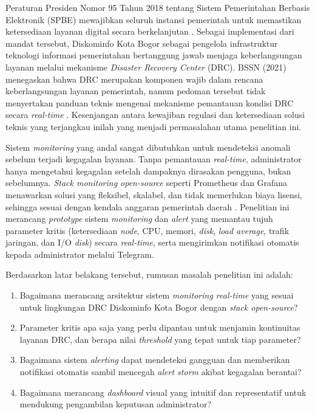 \documentclass[10pt,twocolumn]{article}
\begin{document}
Peraturan Presiden Nomor 95 Tahun 2018 tentang Sistem Pemerintahan Berbasis Elektronik (SPBE)
mewajibkan seluruh instansi pemerintah untuk memastikan ketersediaan layanan digital secara
berkelanjutan \cite{perpres2018}. Sebagai implementasi dari mandat tersebut, Diskominfo Kota Bogor
sebagai pengelola infrastruktur teknologi informasi pemerintahan bertanggung jawab menjaga
keberlangsungan layanan melalui mekanisme \textit{Disaster Recovery Center} (DRC). BSSN (2021)
menegaskan bahwa DRC merupakan komponen wajib dalam rencana keberlangsungan layanan pemerintah,
namun pedoman tersebut tidak menyertakan panduan teknis mengenai mekanisme pemantauan kondisi DRC
secara \textit{real-time} \cite{bssn2021}. Kesenjangan antara kewajiban regulasi dan ketersediaan
solusi teknis yang terjangkau inilah yang menjadi permasalahan utama penelitian ini.

Sistem \textit{monitoring} yang andal sangat dibutuhkan untuk mendeteksi anomali sebelum terjadi
kegagalan layanan. Tanpa pemantauan \textit{real-time}, administrator hanya mengetahui kegagalan
setelah dampaknya dirasakan pengguna, bukan sebelumnya. \textit{Stack monitoring open-source} seperti
Prometheus dan Grafana menawarkan solusi yang fleksibel, skalabel, dan tidak memerlukan biaya lisensi,
sehingga sesuai dengan kendala anggaran pemerintah daerah \cite{pivotto2023}. Penelitian ini merancang
\textit{prototype} sistem \textit{monitoring} dan \textit{alert} yang memantau tujuh parameter kritis
(ketersediaan \textit{node}, CPU, memori, \textit{disk}, \textit{load average}, trafik jaringan, dan
I/O \textit{disk}) secara \textit{real-time}, serta mengirimkan notifikasi otomatis kepada
administrator melalui Telegram.

Berdasarkan latar belakang tersebut, rumusan masalah penelitian ini adalah:
\begin{enumerate}[leftmargin=*, label=\arabic*.]
  \item Bagaimana merancang arsitektur sistem \textit{monitoring real-time} yang sesuai untuk
        lingkungan DRC Diskominfo Kota Bogor dengan \textit{stack open-source}?
  \item Parameter kritis apa saja yang perlu dipantau untuk menjamin kontinuitas layanan DRC, dan
        berapa nilai \textit{threshold} yang tepat untuk tiap parameter?
  \item Bagaimana sistem \textit{alerting} dapat mendeteksi gangguan dan memberikan notifikasi
        otomatis sambil mencegah \textit{alert storm} akibat kegagalan berantai?
  \item Bagaimana merancang \textit{dashboard} visual yang intuitif dan representatif untuk
        mendukung pengambilan keputusan administrator?
\end{enumerate}
\end{document}
